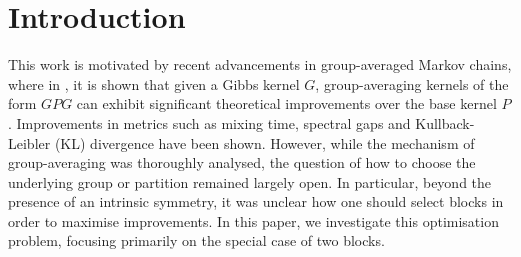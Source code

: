 \documentclass[EJP]{ejpecp} %
\begin{document}


\section{Introduction}
This work is motivated by recent advancements in group-averaged Markov chains, where in \cite{GPG}, it is shown that given a Gibbs kernel $G$, group-averaging kernels of the form $GPG$ can exhibit significant theoretical improvements over the base kernel $P$. Improvements in metrics such as mixing time, spectral gaps and Kullback-Leibler (KL) divergence have been shown. However, while the mechanism of group-averaging was thoroughly analysed, the question of how to choose the underlying group or partition remained largely open. In particular, beyond the presence of an intrinsic symmetry, it was unclear how one should select blocks in order to maximise improvements. In this paper, we investigate this optimisation problem, focusing primarily on the special case of two blocks. 
\end{document}
